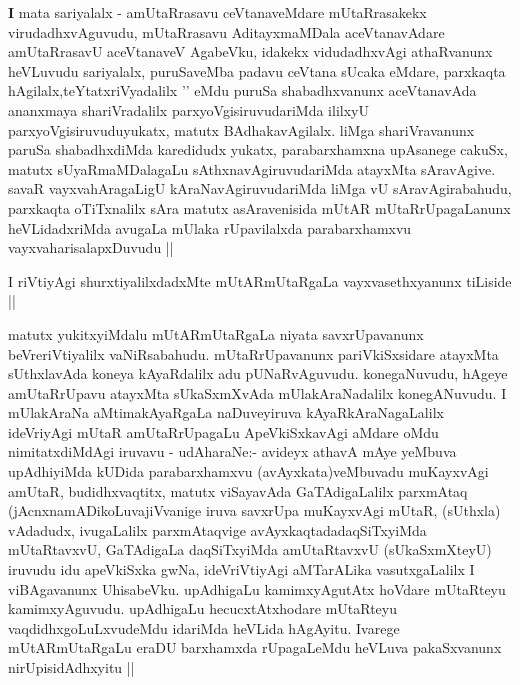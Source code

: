 \begin{artha}
{\textbf I mata sariyalalx -} amUtaRrasavu ceVtanaveMdare
mUtaRrasakekx virudadhxvAguvudu, mUtaRrasavu AditayxmaMDala
aceVtanavAdare amUtaRrasavU aceVtanaveV AgabeVku, idakekx
vidudadhxvAgi athaRvanunx heVLuvudu sariyalalx, puruSaveMba padavu
ceVtana sUcaka eMdare, parxkaqta hAgilalx,teYtatxriVyadalilx '\stext'
eMdu puruSa shabadhxvanunx aceVtanavAda ananxmaya shariVradalilx
parxyoVgisiruvudariMda ililxyU parxyoVgisiruvuduyukatx, matutx
BAdhakavAgilalx. liMga shariVravanunx paruSa shabadhxdiMda karedidudx
yukatx, parabarxhamxna upAsanege cakuSx, matutx sUyaRmaMDalagaLu
sAthxnavAgiruvudariMda atayxMta sAravAgive. savaR vayxvahAragaLigU
kAraNavAgiruvudariMda liMga vU sAravAgirabahudu, parxkaqta oTiTxnalilx
sAra matutx asAravenisida mUtAR mUtaRrUpagaLanunx heVLidadxriMda
avugaLa mUlaka rUpavilalxda parabarxhamxvu vayxvaharisalapxDuvudu ||
\end{artha}

\begin{artha}
I riVtiyAgi shurxtiyalilxdadxMte mUtARmUtaRgaLa vayxvasethxyanunx
tiLiside ||
\end{artha}


\begin{center}


\end{center}


\begin{artha}
matutx yukitxyiMdalu mUtARmUtaRgaLa niyata savxrUpavanunx
beVreriVtiyalilx vaNiRsabahudu. mUtaRrUpavanunx pariVkiSxsidare
atayxMta sUthxlavAda koneya kAyaRdalilx adu
pUNaRvAguvudu. konegaNuvudu, hAgeye amUtaRrUpavu atayxMta sUkaSxmXvAda
mUlakAraNadalilx konegANuvudu. I mUlakAraNa aMtimakAyaRgaLa
naDuveyiruva kAyaRkAraNagaLalilx ideVriyAgi mUtaR amUtaRrUpagaLu
ApeVkiSxkavAgi aMdare oMdu nimitatxdiMdAgi iruvavu - udAharaNe:-
avideyx athavA mAye yeMbuva upAdhiyiMda kUDida parabarxhamxvu
(avAyxkata)veMbuvadu muKayxvAgi amUtaR, budidhxvaqtitx, matutx
viSayavAda GaTAdigaLalilx parxmAtaq (jAcnxnamADikoLuvajiVvanige iruva
savxrUpa muKayxvAgi mUtaR, (sUthxla) vAdadudx, ivugaLalilx
parxmAtaqvige avAyxkaqtadadaqSiTxyiMda mUtaRtavxvU, GaTAdigaLa
daqSiTxyiMda amUtaRtavxvU (sUkaSxmXteyU) iruvudu idu apeVkiSxka gwNa,
ideVriVtiyAgi aMTarALika vasutxgaLalilx I viBAgavanunx
UhisabeVku. upAdhigaLu kamimxyAgutAtx hoVdare mUtaRteyu
kamimxyAguvudu. upAdhigaLu hecucxtAtxhodare mUtaRteyu
vaqdidhxgoLuLxvudeMdu idariMda heVLida hAgAyitu. Ivarege
mUtARmUtaRgaLu eraDU barxhamxda rUpagaLeMdu heVLuva pakaSxvanunx
nirUpisidAdhxyitu || 
\end{artha}

